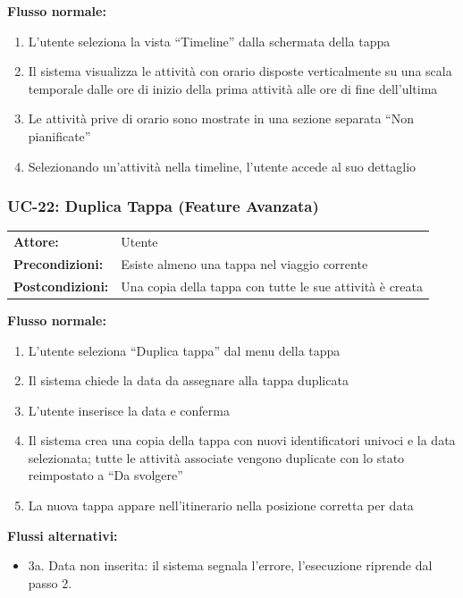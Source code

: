 \documentclass[12pt, a4paper]{article}
\makeatletter
\newcommand{\ucblock}[3]{%
  \noindent
  \begin{tabular}{@{}ll@{}}
    \textbf{Attore:}         & #1 \\
    \textbf{Precondizioni:}  & #2 \\
    \textbf{Postcondizioni:} & #3 \\
  \end{tabular}%
  \medskip
}
\makeatother
\begin{document}
\noindent\textbf{Flusso normale:}
\begin{enumerate}[leftmargin=1.5em, itemsep=1pt]
  \item L'utente seleziona la vista ``Timeline'' dalla schermata della tappa
  \item Il sistema visualizza le attività con orario disposte verticalmente su una
    scala temporale dalle ore di inizio della prima attività alle ore di fine dell'ultima
  \item Le attività prive di orario sono mostrate in una sezione separata ``Non pianificate''
  \item Selezionando un'attività nella timeline, l'utente accede al suo dettaglio
\end{enumerate}

\subsubsection{UC-22: Duplica Tappa (Feature Avanzata)}

\ucblock{Utente}{Esiste almeno una tappa nel viaggio corrente}{Una copia della tappa con tutte le sue attività è creata}

\noindent\textbf{Flusso normale:}
\begin{enumerate}[leftmargin=1.5em, itemsep=1pt]
  \item L'utente seleziona ``Duplica tappa'' dal menu della tappa
  \item Il sistema chiede la data da assegnare alla tappa duplicata
  \item L'utente inserisce la data e conferma
  \item Il sistema crea una copia della tappa con nuovi identificatori univoci e
    la data selezionata; tutte le attività associate vengono duplicate con lo stato
    reimpostato a ``Da svolgere''
  \item La nuova tappa appare nell'itinerario nella posizione corretta per data
\end{enumerate}

\noindent\textbf{Flussi alternativi:}
\begin{itemize}[leftmargin=1.5em, itemsep=1pt]
  \item 3a. Data non inserita: il sistema segnala l'errore, l'esecuzione riprende dal passo 2.
\end{itemize}

\end{document}
